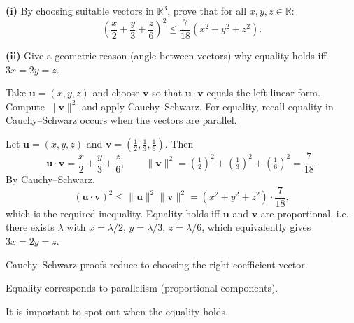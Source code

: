 \begin{problem}
    \textbf{(i)} 
By choosing suitable vectors in $\mathbb{R}^3$, prove that for all $x,y,z\in\mathbb{R}$:
\[
\left( \frac{x}{2} + \frac{y}{3} + \frac{z}{6} \right)^2 \le \frac{7}{18}(x^2 + y^2 + z^2).
\]

	\textbf{(ii)} Give a geometric reason (angle between vectors) why equality holds iff $3x=2y=z$.
\end{problem}

\begin{hint}
Take $\mathbf{u}=(x,y,z)$ and choose $\mathbf{v}$ so that $\mathbf{u}\cdot\mathbf{v}$ equals the left linear form. Compute $\|\mathbf{v}\|^2$ and apply Cauchy--Schwarz. For equality, recall equality in Cauchy--Schwarz occurs when the vectors are parallel.
\end{hint}

\begin{solution}
Let $\mathbf{u}=(x,y,z)$ and $\mathbf{v}=(\tfrac{1}{2},\tfrac{1}{3},\tfrac{1}{6})$. Then
\[
\mathbf{u}\cdot\mathbf{v}=\frac{x}{2}+\frac{y}{3}+\frac{z}{6},\qquad
\|\mathbf{v}\|^2=\left(\tfrac{1}{2}\right)^2+\left(\tfrac{1}{3}\right)^2+\left(\tfrac{1}{6}\right)^2=\frac{7}{18}.
\]
By Cauchy--Schwarz,
\[
(\mathbf{u}\cdot\mathbf{v})^2\le\|\mathbf{u}\|^2\|\mathbf{v}\|^2=(x^2+y^2+z^2)\cdot\frac{7}{18},
\]
which is the required inequality. Equality holds iff $\mathbf{u}$ and $\mathbf{v}$ are proportional, i.e. there exists $\lambda$ with
$x=\lambda/2$, $y=\lambda/3$, $z=\lambda/6$, which equivalently gives $3x=2y=z$.
\end{solution}

\begin{takeaways}
\item Cauchy--Schwarz proofs reduce to choosing the right coefficient vector.
\item Equality corresponds to parallelism (proportional components).
\item It is important to spot out when the equality holds.
\end{takeaways}
